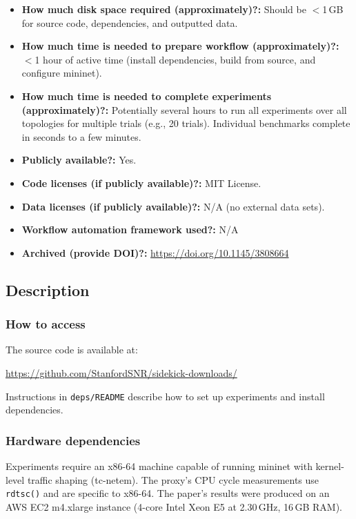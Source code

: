 \documentclass[sigplan,review]{acmart}
\begin{document}
{\begin{itemize}
  \item {\bf How much disk space required (approximately)?: } Should be $<$1\,GB
    for source code, dependencies, and outputted data.
  \item {\bf How much time is needed to prepare workflow (approximately)?:} $<$1 hour of active time (install dependencies, build from source, and configure mininet).
  \item {\bf How much time is needed to complete experiments (approximately)?: } Potentially several hours to run all experiments over all topologies for multiple trials (e.g., 20 trials). Individual benchmarks complete in seconds to a few minutes.
  \item {\bf Publicly available?: } Yes.
  \item {\bf Code licenses (if publicly available)?: } MIT License.
  \item {\bf Data licenses (if publicly available)?: } N/A (no external data sets).
  \item {\bf Workflow automation framework used?: } N/A
  \item {\bf Archived (provide DOI)?: } \url{https://doi.org/10.1145/3808664}
\end{itemize}
}

\subsection{Description}

\subsubsection{How to access}

The source code is available at:
\begin{center}
  \url{https://github.com/StanfordSNR/sidekick-downloads/}
\end{center}

Instructions in \texttt{deps/README} describe how to set up experiments and install dependencies.

\subsubsection{Hardware dependencies}

Experiments require an x86-64 machine capable of running mininet with
kernel-level traffic shaping (tc-netem). The proxy's CPU cycle
measurements use \texttt{rdtsc()} and are specific to x86-64.
The paper's results were
produced on an AWS EC2 m4.xlarge instance (4-core Intel Xeon E5 at
2.30\,GHz, 16\,GB RAM).
\end{document}
